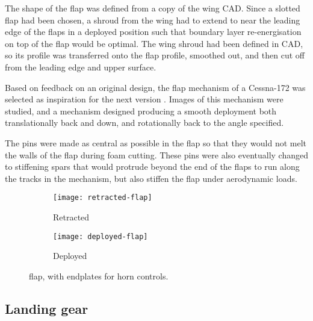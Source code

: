 \documentclass[../../main.tex]{subfiles}
\begin{document}
The shape of the flap was defined from a copy of the wing CAD.
Since a slotted flap had been chosen, a shroud from the wing had to extend to near the leading edge of the flaps in a deployed position such that boundary layer re-energisation on top of the flap would be optimal.
The wing shroud had been defined in CAD, so its profile was transferred onto the flap profile, smoothed out, and then cut off from the leading edge and upper surface.  

Based on feedback on an original design, the flap mechanism of a Cessna-172 was selected as inspiration for the next version \cite{towell-19}.
Images of this mechanism were studied, and a mechanism designed producing a smooth deployment both translationally back and down, and rotationally back to the  angle specified. 


The pins were made as central as possible in the flap so that they would not melt the walls of the flap during foam cutting.
These pins were also eventually changed to stiffening spars that would protrude beyond the end of the flaps to run along the tracks in the mechanism, but also stiffen the flap under aerodynamic loads.


\begin{figure}[H]

    \centering
    \begin{subfigure}[b]{0.49\columnwidth}
        \centering
        \texttt{[image: retracted-flap]}
        \caption{Retracted}
        \label{fig:flaps:retracted}
    \end{subfigure}
    \hfill
    \begin{subfigure}[b]{0.49\columnwidth}
        \centering
        \texttt{[image: deployed-flap]}
        \caption{Deployed}
        \label{fig:flaps:deployed}
    \end{subfigure}
    
    \caption{flap, with endplates for horn controls.}
    \label{fig:flaps}
\end{figure}

\subsection{Landing gear} \label{sec:design-process:design-revision:landing-gear}
\end{document}
